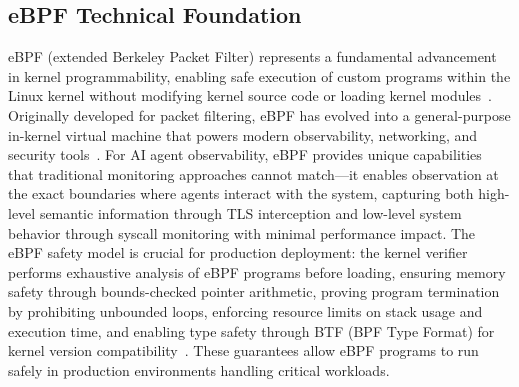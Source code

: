 \subsection{eBPF Technical Foundation}

eBPF (extended Berkeley Packet Filter) represents a fundamental advancement in kernel programmability, enabling safe execution of custom programs within the Linux kernel without modifying kernel source code or loading kernel modules~\cite{brendangregg}. Originally developed for packet filtering, eBPF has evolved into a general-purpose in-kernel virtual machine that powers modern observability, networking, and security tools~\cite{ebpfio,cilium}. For AI agent observability, eBPF provides unique capabilities that traditional monitoring approaches cannot match—it enables observation at the exact boundaries where agents interact with the system, capturing both high-level semantic information through TLS interception and low-level system behavior through syscall monitoring with minimal performance impact. The eBPF safety model is crucial for production deployment: the kernel verifier performs exhaustive analysis of eBPF programs before loading, ensuring memory safety through bounds-checked pointer arithmetic, proving program termination by prohibiting unbounded loops, enforcing resource limits on stack usage and execution time, and enabling type safety through BTF (BPF Type Format) for kernel version compatibility~\cite{kerneldoc}. These guarantees allow eBPF programs to run safely in production environments handling critical workloads.
